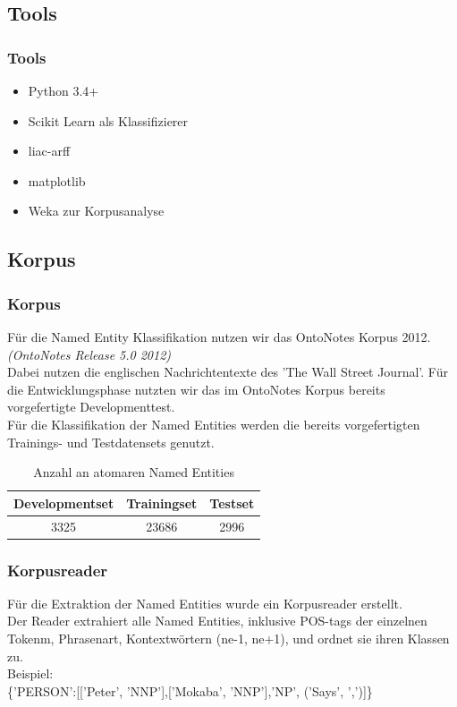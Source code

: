 \documentclass{beamer}
\begin{document}
	\subsection{Tools}
	\begin{frame}
			\frametitle{Tools}
			\begin{itemize}
				\item Python 3.4+
				\item Scikit Learn als Klassifizierer
				\item liac-arff
				\item matplotlib
				\item Weka zur Korpusanalyse
			\end{itemize}
	\end{frame}
	\subsection{Korpus}
	\begin{frame}
			\frametitle{Korpus}
			Für die Named Entity Klassifikation nutzen wir das OntoNotes Korpus 2012. \textit{(OntoNotes Release 5.0 2012)}\\
			
			Dabei nutzen die englischen Nachrichtentexte des 'The Wall Street Journal'.
			Für die Entwicklungsphase nutzten wir das im OntoNotes Korpus bereits vorgefertigte Developmenttest.\\
			
			Für die Klassifikation der Named Entities werden die bereits vorgefertigten Trainings- und Testdatensets genutzt.\\
			 \begin{table}
			 	\caption{Anzahl an atomaren Named Entities}
			 	\begin{tabular}{ccc}
			 		\toprule
					Developmentset & Trainingset & Testset\\
			 		\midrule
					3325 & 23686 & 2996\\
			 		\bottomrule
			 	\end{tabular}
			 	\label{tab:datasets}
			 \end{table}
	\end{frame}
		\begin{frame}
			\frametitle{Korpusreader}
			Für die Extraktion der Named Entities wurde ein Korpusreader erstellt.\\
			Der Reader extrahiert alle Named Entities, inklusive POS-tags der einzelnen Tokenm, Phrasenart, Kontextwörtern (ne-1, ne+1), und ordnet sie ihren Klassen zu.\\
			
			Beispiel:\\
			\{'PERSON':[['Peter', 'NNP'],['Mokaba', 'NNP'],'NP', ('Says', ',')]\}
		\end{frame}
	
\end{document}
